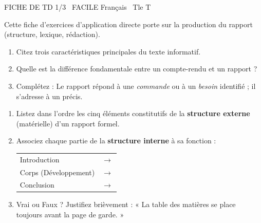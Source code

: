 \documentclass[11pt]{article}
\begin{document}
\begin{tcolorbox}[enhanced,colback=popink,colframe=popink,arc=10pt,boxrule=0pt,left=12pt,right=12pt,top=9pt,bottom=9pt]
{\color{white}\popxbold\small FICHE DE TD 1/3 \textbullet\ FACILE \hfill Français \textbullet\ Tle T\par}
\end{tcolorbox}
\vspace{4pt}
\noindent Cette fiche d'exercices d'application directe porte sur la production du rapport (structure, lexique, rédaction).\\

\begin{exercice}
\begin{enumerate}
    \item Citez trois caractéristiques principales du texte informatif.
    \item Quelle est la différence fondamentale entre un compte-rendu et un rapport ?
    \item Complétez : Le rapport répond à une \textit{commande} ou à un \textit{besoin} identifié ; il s'adresse à un \underline{\hspace{4cm}} précis.
\end{enumerate}
\end{exercice}

\begin{exercice}
\begin{enumerate}
    \item Listez dans l'ordre les cinq éléments constitutifs de la \textbf{structure externe} (matérielle) d'un rapport formel.
    \item Associez chaque partie de la \textbf{structure interne} à sa fonction :
    \begin{tabular}{ll}
        Introduction & $\rightarrow$ \underline{\hspace{5cm}} \\
        Corps (Développement) & $\rightarrow$ \underline{\hspace{5cm}} \\
        Conclusion & $\rightarrow$ \underline{\hspace{5cm}} \\
    \end{tabular}
    \item Vrai ou Faux ? Justifiez brièvement : « La table des matières se place toujours avant la page de garde. »
\end{enumerate}
\end{exercice}
\end{document}
